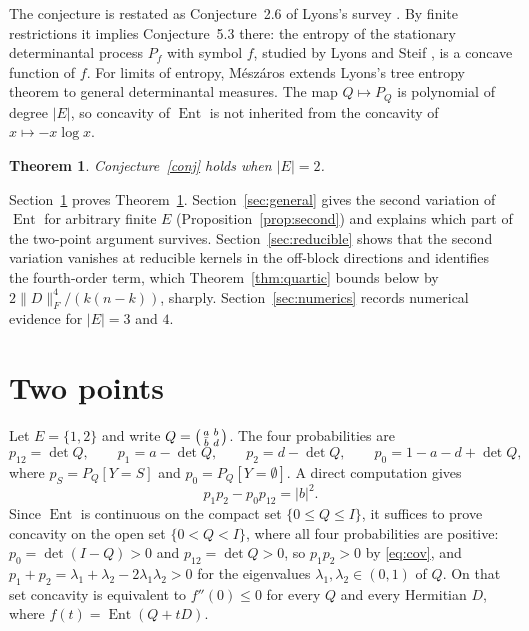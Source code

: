\documentclass[11pt]{amsart}
\newtheorem{theorem}{Theorem}[section]
\theoremstyle{remark}
\numberwithin{equation}{section}
\newcommand{\Ent}{\operatorname{Ent}}
\begin{document}
The conjecture is restated as Conjecture~2.6 of Lyons's survey \cite{Ly14}. By finite restrictions it implies Conjecture~5.3 there: the entropy of the stationary determinantal process $P_f$ with symbol $f$, studied by Lyons and Steif \cite{LS03}, is a concave function of $f$. For limits of entropy, M\'esz\'aros \cite{Me20} extends Lyons's tree entropy theorem to general determinantal measures. The map $Q\mapsto P_Q$ is polynomial of degree $|E|$, so concavity of $\Ent$ is not inherited from the concavity of $x\mapsto -x\log x$.

\begin{theorem}\label{thm:main}
Conjecture~\ref{conj} holds when $|E|=2$.
\end{theorem}

Section~\ref{sec:two} proves Theorem~\ref{thm:main}. Section~\ref{sec:general} gives the second variation of $\Ent$ for arbitrary finite $E$ (Proposition~\ref{prop:second}) and explains which part of the two-point argument survives. Section~\ref{sec:reducible} shows that the second variation vanishes at reducible kernels in the off-block directions and identifies the fourth-order term, which Theorem~\ref{thm:quartic} bounds below by $2\|D\|_F^4/(k(n-k))$, sharply. Section~\ref{sec:numerics} records numerical evidence for $|E|=3$ and $4$.

\section{Two points}\label{sec:two}

Let $E=\{1,2\}$ and write $Q=\begin{psmallmatrix}a&b\\\bar b&d\end{psmallmatrix}$. The four probabilities are
\begin{equation}\label{eq:p}
p_{12}=\det Q,\qquad p_1=a-\det Q,\qquad p_2=d-\det Q,\qquad p_0=1-a-d+\det Q,
\end{equation}
where $p_S=P_Q[Y=S]$ and $p_0=P_Q[Y=\emptyset]$. A direct computation gives
\begin{equation}\label{eq:cov}
p_1p_2-p_0p_{12}=|b|^2 .
\end{equation}
Since $\Ent$ is continuous on the compact set $\{0\le Q\le I\}$, it suffices to prove concavity on the open set $\{0<Q<I\}$, where all four probabilities are positive: $p_0=\det(I-Q)>0$ and $p_{12}=\det Q>0$, so $p_1p_2>0$ by \eqref{eq:cov}, and $p_1+p_2=\lambda_1+\lambda_2-2\lambda_1\lambda_2>0$ for the eigenvalues $\lambda_1,\lambda_2\in(0,1)$ of $Q$. On that set concavity is equivalent to $f''(0)\le0$ for every $Q$ and every Hermitian $D$, where $f(t)=\Ent(Q+tD)$.
\end{document}
